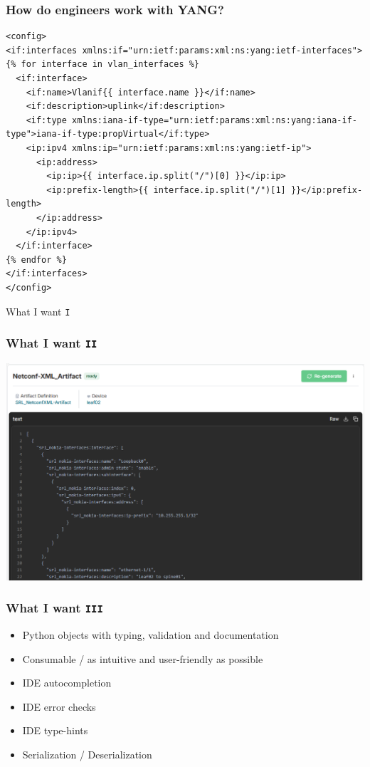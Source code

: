 \documentclass[aspectratio=169]{beamer}
\begin{document}
\begin{frame}[fragile]
  \frametitle{How do engineers work with YANG?}
  \begin{verbatim}
<config>
<if:interfaces xmlns:if="urn:ietf:params:xml:ns:yang:ietf-interfaces">
{% for interface in vlan_interfaces %}
  <if:interface>
    <if:name>Vlanif{{ interface.name }}</if:name>
    <if:description>uplink</if:description>
    <if:type xmlns:iana-if-type="urn:ietf:params:xml:ns:yang:iana-if-type">iana-if-type:propVirtual</if:type>
    <ip:ipv4 xmlns:ip="urn:ietf:params:xml:ns:yang:ietf-ip">
      <ip:address>
        <ip:ip>{{ interface.ip.split("/")[0] }}</ip:ip>
        <ip:prefix-length>{{ interface.ip.split("/")[1] }}</ip:prefix-length>
      </ip:address>
    </ip:ipv4>
  </if:interface>
{% endfor %}
</if:interfaces>
</config>
\end{verbatim}
\end{frame}

\begin{frame}{What I want \texttt{I}}
\centering
{}
\end{frame}

\begin{frame}
  \frametitle{What I want \texttt{II}}
  \centering
  \includegraphics[height = 0.8\textheight]{images/netconf-xml-artifact.png}

\end{frame}

\begin{frame}
  \frametitle{What I want \texttt{III}}
  \begin{itemize}
    \setlength\itemsep{1em}
    \item Python objects with typing, validation and documentation
    \item Consumable / as intuitive and user-friendly as possible
    \item IDE autocompletion
    \item IDE error checks
    \item IDE type-hints
    \item Serialization / Deserialization
  \end{itemize}
\end{frame}
\end{document}

